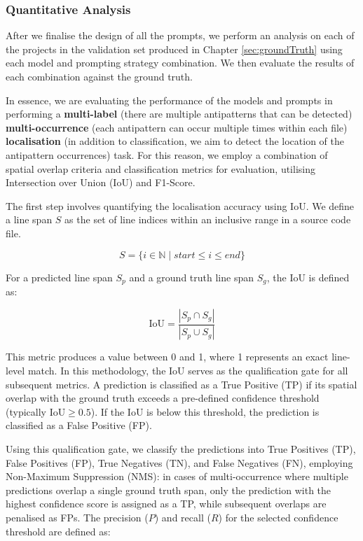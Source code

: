 \documentclass{article}
\begin{document}
\subsubsection{Quantitative Analysis}\label{sec:experimentsQuantitative}

After we finalise the design of all the prompts, we perform an analysis on each of the projects in the validation set produced in Chapter \ref{sec:groundTruth} using each model and prompting strategy combination. We then evaluate the results of each combination against the ground truth.

In essence, we are evaluating the performance of the models and prompts in performing a \textbf{multi-label} (there are multiple antipatterns that can be detected) \textbf{multi-occurrence} (each antipattern can occur multiple times within each file) \textbf{localisation} (in addition to classification, we aim to detect the location of the antipattern occurrences) task. For this reason, we employ a combination of spatial overlap criteria and classification metrics for evaluation, utilising Intersection over Union (IoU) and F1-Score.

The first step involves quantifying the localisation accuracy using IoU. We define a line span \(S\) as the set of line indices within an inclusive range in a source code file. 

\[S = \{i \in \mathbb{N} \mid start \le i \le end\}\]

For a predicted line span \(S_p\) and a ground truth line span \(S_g\), the IoU is defined as:

\[\text{IoU} = \frac{|S_p \cap S_g|}{|S_p \cup S_g|}\]

This metric produces a value between 0 and 1, where 1 represents an exact line-level match. In this methodology, the IoU serves as the qualification gate for all subsequent metrics. A prediction is classified as a True Positive (TP) if its spatial overlap with the ground truth exceeds a pre-defined confidence threshold (typically \(\text{IoU} \geq 0.5\)). If the IoU is below this threshold, the prediction is classified as a False Positive (FP).

Using this qualification gate, we classify the predictions into True Positives (TP), False Positives (FP), True Negatives (TN), and False Negatives (FN), employing Non-Maximum Suppression (NMS): in cases of multi-occurrence where multiple predictions overlap a single ground truth span, only the prediction with the highest confidence score is assigned as a TP, while subsequent overlaps are penalised as FPs. The precision (\(P\)) and recall (\(R\)) for the selected confidence threshold are defined as:
\end{document}
